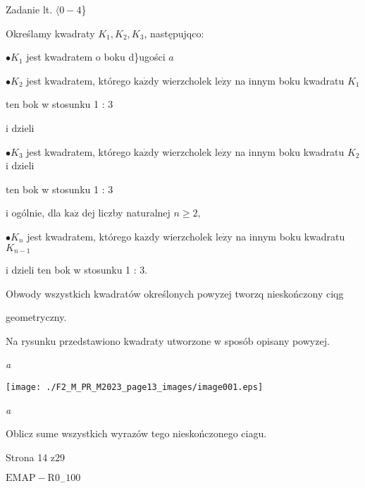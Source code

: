 \documentclass[a4paper,12pt]{article}
\begin{document}
Zadanie lt. $\langle 0-4$\}

Określamy kwadraty $K_{1}, K_{2}, K_{3}$, następujqco:

$\bullet K_{1}$ jest kwadratem o boku d\}ugości $a$

$\bullet K_{2}$ jest kwadratem, którego $\mathrm{k}\mathrm{a}\dot{\mathrm{z}}\mathrm{d}\mathrm{y}$ wierzcholek $\mathrm{l}\mathrm{e}\dot{\mathrm{z}}\mathrm{y}$ na innym boku kwadratu $K_{1}$

ten bok w stosunku 1 : 3

i dzieli

$\bullet K_{3}$ jest kwadratem, którego $\mathrm{k}\mathrm{a}\dot{\mathrm{z}}\mathrm{d}\mathrm{y}$ wierzcholek $\mathrm{l}\mathrm{e}\dot{\mathrm{z}}\mathrm{y}$ na innym boku kwadratu $K_{2}$ i dzieli

ten bok w stosunku 1 : 3

i ogólnie, dla $\mathrm{k}\mathrm{a}\dot{\mathrm{z}}$ dej liczby naturalnej $n\geq 2,$

$\bullet K_{n}$ jest kwadratem, którego $\mathrm{k}\mathrm{a}\dot{\mathrm{z}}\mathrm{d}\mathrm{y}$ wierzcholek $\mathrm{l}\mathrm{e}\dot{\mathrm{z}}\mathrm{y}$ na innym boku kwadratu $K_{n-1}$

i dzieli ten bok w stosunku 1 : 3.

Obwody wszystkich kwadratów określonych powyzej tworzq nieskończony ciqg

geometryczny.

Na rysunku przedstawiono kwadraty utworzone w sposób opisany powyzej.

{\it a}
\begin{center}
\texttt{[image: ./F2\_M\_PR\_M2023\_page13\_images/image001.eps]}
\end{center}
{\it a}

Oblicz sume wszystkich wyrazów tego nieskończonego ciagu.

Strona 14 z29

$\mathrm{E}\mathrm{M}\mathrm{A}\mathrm{P}-\mathrm{R}0_{-}100$
\end{document}
